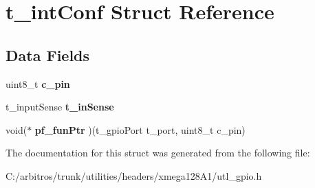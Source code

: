 \hypertarget{structt__int_conf}{\section{t\-\_\-int\-Conf Struct Reference}
\label{structt__int_conf}
}
\subsection*{Data Fields}
\begin{DoxyCompactItemize}
\item 
\hypertarget{structt__int_conf_a3cda2c30757cf10ea894dd09e081085d}{uint8\-\_\-t {\bfseries c\-\_\-pin}}\label{structt__int_conf_a3cda2c30757cf10ea894dd09e081085d}

\item 
\hypertarget{structt__int_conf_a4b0e7887270a872461cf80b6520f9391}{t\-\_\-input\-Sense {\bfseries t\-\_\-in\-Sense}}\label{structt__int_conf_a4b0e7887270a872461cf80b6520f9391}

\item 
\hypertarget{structt__int_conf_a09f8df47b88306f5df99f6c0c7044ff2}{void($\ast$ {\bfseries pf\-\_\-fun\-Ptr} )(t\-\_\-gpio\-Port t\-\_\-port, uint8\-\_\-t c\-\_\-pin)}\label{structt__int_conf_a09f8df47b88306f5df99f6c0c7044ff2}

\end{DoxyCompactItemize}


The documentation for this struct was generated from the following file\-:\begin{DoxyCompactItemize}
\item 
C\-:/arbitros/trunk/utilities/headers/xmega128\-A1/utl\-\_\-gpio.\-h\end{DoxyCompactItemize}
